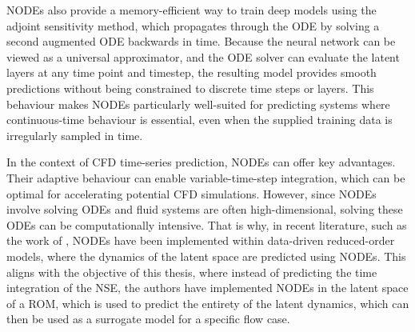 


NODEs also provide a memory-efficient way to train deep models using the adjoint sensitivity method, which propagates through the ODE by solving a second augmented ODE backwards in time. Because the neural network can be viewed as a universal approximator, and the ODE solver can evaluate the latent layers at any time point and timestep, the resulting model provides smooth predictions without being constrained to discrete time steps or layers. This behaviour makes NODEs particularly well-suited for predicting systems where continuous-time behaviour is essential, even when the supplied training data is irregularly sampled in time. 

In the context of CFD time-series prediction, NODEs can offer key advantages. Their adaptive behaviour can enable variable-time-step integration, which can be optimal for accelerating potential CFD simulations. However, since NODEs involve solving ODEs and fluid systems are often high-dimensional, solving these ODEs can be computationally intensive. That is why, in recent literature, such as the work of \textcite{Shankar2022}, NODEs have been implemented within data-driven reduced-order models, where the dynamics of the latent space are predicted using NODEs. This aligns with the objective of this thesis, where instead of predicting the time integration of the NSE, the authors have implemented NODEs in the latent space of a ROM, which is used to predict the entirety of the latent dynamics, which can then be used as a surrogate model for a specific flow case. 

